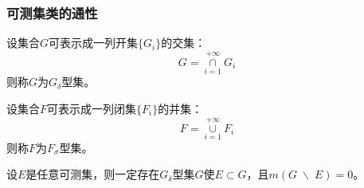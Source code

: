\subsubsection{可测集类的通性}
\begin{definition}
	设集合$G$可表示成一列开集$\{G_i\}$的交集：
	\begin{equation*}
		G=\underset{i=1}{\overset{+\infty}{\cap}}G_i
	\end{equation*}
	则称$G$为$G_\delta$型集。
\end{definition}
\begin{definition}
	设集合$F$可表示成一列闭集$\{F_i\}$的并集：
	\begin{equation*}
		F=\underset{i=1}{\overset{+\infty}{\cup}}F_i
	\end{equation*}
	则称$F$为$F_\sigma$型集。
\end{definition}
\begin{theorem}
	设$E$是任意可测集，则一定存在$G_\delta$型集$G$使$E\subset G$，且$m(G\;\backslash\; E)=0$。
\end{theorem}
